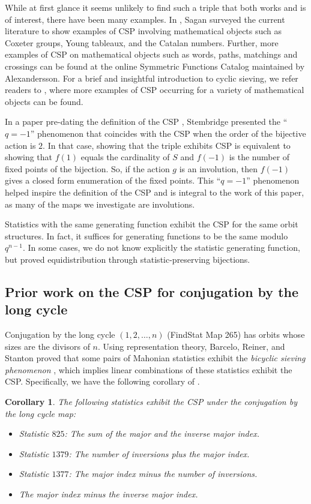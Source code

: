 \documentclass{amsart}
\newtheorem{cor}[thm]{Corollary}
\theoremstyle{definition}
\begin{document}
While at first glance it seems unlikely to find such a triple that both works and is of interest, there have been many examples. In \cite{SaganCSP}, Sagan surveyed the current literature to show examples of CSP involving mathematical objects such as Coxeter groups, Young tableaux, and the Catalan numbers. Further, more examples of CSP on mathematical objects such as words, paths, matchings and crossings can be found at the online Symmetric Functions Catalog \cite{CSPwebsite} maintained by Alexandersson. For a brief and insightful introduction to cyclic sieving, we refer readers to \cite{WhatIsCSP}, where more examples of CSP occurring for a variety of mathematical objects can be found.

In a paper pre-dating the  definition of the CSP \cite{JStembridge}, Stembridge presented the ``$q = -1$'' phenomenon that coincides with the CSP when the order of the bijective action is $2$. In that case, showing that the triple exhibits CSP is equivalent to showing that $f(1)$ equals the cardinality of $S$ and $f(-1)$ is the number of fixed points of the bijection. So, if the action $g$ is an involution, then $f(-1)$ gives a closed form enumeration of the fixed points. %
This ``$q = -1$'' phenomenon helped inspire the definition of the CSP and is integral to the work of this paper, as many of the maps we investigate are involutions.

Statistics with the same generating function exhibit the CSP for the same orbit structures. In fact, it suffices for generating functions to be the same modulo $q^{n-1}$. In some cases, we do not know explicitly the statistic generating function, but proved equidistribution through statistic-preserving bijections.

\subsection{Prior work on the CSP for conjugation by the long cycle}
\label{sec:conj}
Conjugation by the long cycle $(1, 2, \ldots, n)$  (FindStat Map 265) has orbits whose sizes are the divisors of $n$. 
Using representation theory, Barcelo, Reiner, and Stanton proved that some pairs of Mahonian statistics exhibit the \emph{bicyclic sieving phenomenon} \cite[Theorem 1.4]{BRS}, which implies linear combinations of these  statistics exhibit the CSP.
Specifically, we have the following corollary of \cite[Theorem 1.4]{BRS}.

\begin{cor}
  The following statistics exhibit the CSP under the conjugation by the long cycle map:
  \begin{itemize}
    \item Statistic $825$: The sum of the major and the inverse major index.
    \item Statistic $1379$: The number of inversions plus the major index.
    \item Statistic $1377$: The major index minus the number of inversions.
    \item The major index minus the inverse major index.
  \end{itemize}
\end{cor}
\end{document}
